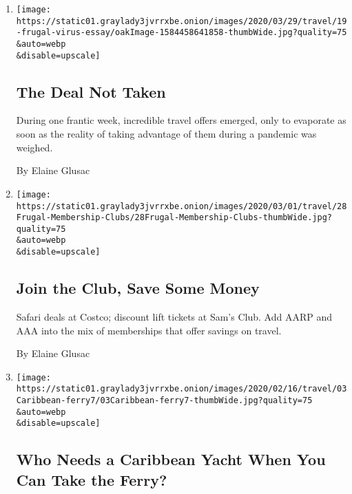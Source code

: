 \begin{enumerate}
\def\labelenumi{\arabic{enumi}.}
\item
  \href{/2020/03/21/travel/budget-travel-coronavirus.html}{}

  \texttt{[image: https://static01.graylady3jvrrxbe.onion/images/2020/03/29/travel/19-frugal-virus-essay/oakImage-1584458641858-thumbWide.jpg?quality=75\\\&auto=webp\\\&disable=upscale]}

  \hypertarget{the-deal-not-taken}{%
  \subsection{The Deal Not Taken}\label{the-deal-not-taken}}

  During one frantic week, incredible travel offers emerged, only to
  evaporate as soon as the reality of taking advantage of them during a
  pandemic was weighed.

  By Elaine Glusac
\item
  \href{/2020/02/29/travel/membership-clubs-budget-travel.html}{}

  \texttt{[image: https://static01.graylady3jvrrxbe.onion/images/2020/03/01/travel/28Frugal-Membership-Clubs/28Frugal-Membership-Clubs-thumbWide.jpg?quality=75\\\&auto=webp\\\&disable=upscale]}

  \hypertarget{join-the-club-save-some-money}{%
  \subsection{Join the Club, Save Some
  Money}\label{join-the-club-save-some-money}}

  Safari deals at Costco; discount lift tickets at Sam's Club. Add AARP
  and AAA into the mix of memberships that offer savings on travel.

  By Elaine Glusac
\item
  \href{/2020/02/10/travel/Caribbean-British-Virgin-Islands-Ferry.html}{}

  \texttt{[image: https://static01.graylady3jvrrxbe.onion/images/2020/02/16/travel/03Caribbean-ferry7/03Caribbean-ferry7-thumbWide.jpg?quality=75\\\&auto=webp\\\&disable=upscale]}

  \hypertarget{who-needs-a-caribbean-yacht-when-you-can-take-the-ferry}{%
  \subsection{Who Needs a Caribbean Yacht When You Can Take the
  Ferry?}\label{who-needs-a-caribbean-yacht-when-you-can-take-the-ferry}}


\end{enumerate}
